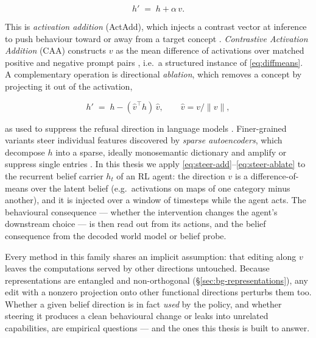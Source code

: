 \begin{equation}
    h' \;=\; h + \alpha\, v.
    \label{eq:steer-add}
\end{equation}

This is \emph{activation addition} (ActAdd), which injects a contrast vector at
inference to push behaviour toward or away from a target concept
\citep{turner2023activation}. \emph{Contrastive Activation Addition} (CAA)
constructs $v$ as the mean difference of activations over matched positive and
negative prompt pairs \citep{rimsky2024steering}, i.e.\ a structured instance of
\eqref{eq:diffmeans}. A complementary operation is directional \emph{ablation},
which removes a concept by projecting it out of the activation,

\begin{equation}
    h' \;=\; h - (\hat{v}^{\top} h)\, \hat{v}, \qquad \hat{v} = v / \lVert v \rVert,
    \label{eq:steer-ablate}
\end{equation}

as used to suppress the refusal direction in language models
\citep{arditi2024refusal}. Finer-grained variants steer individual features
discovered by \emph{sparse autoencoders}, which decompose $h$ into a sparse,
ideally monosemantic dictionary and amplify or suppress single entries
\citep{bricken2023monosemanticity,cunningham2024sparse}. In this thesis we apply
\eqref{eq:steer-add}--\eqref{eq:steer-ablate} to the recurrent belief carrier
$h_t$ of an RL agent: the direction $v$ is a difference-of-means over the latent
belief (e.g.\ activations on maps of one category minus another), and it is
injected over a window of timesteps while the agent acts. The behavioural
consequence --- whether the intervention changes the agent's downstream choice
--- is then read out from its actions, and the belief consequence from the
decoded world model or belief probe.

Every method in this family shares an implicit assumption: that editing along
$v$ leaves the computations served by other directions untouched. Because
representations are entangled and non-orthogonal
(\S\ref{sec:bg-representations}), any edit with a nonzero projection onto other
functional directions perturbs them too. Whether a given belief direction is
in fact \emph{used} by the policy, and whether steering it produces a clean
behavioural change or leaks into unrelated capabilities, are empirical questions
--- and the ones this thesis is built to answer.

